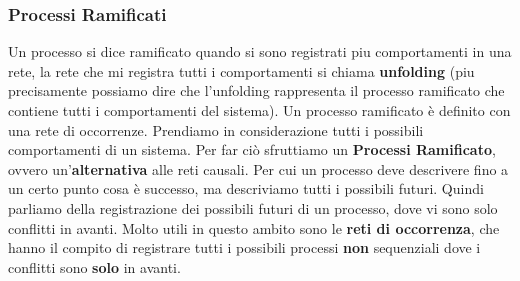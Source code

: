 \subsubsection{Processi Ramificati}
Un processo si dice ramificato quando si sono registrati piu comportamenti in una rete, la rete che
mi registra tutti i comportamenti si chiama \textbf{unfolding} (piu precisamente possiamo dire che l’unfolding
rappresenta il processo ramificato che contiene tutti i comportamenti del sistema). Un processo
ramificato è definito con una rete di occorrenze.
Prendiamo in considerazione tutti i possibili comportamenti di un sistema. Per far ciò sfruttiamo un \textbf{Processi Ramificato}, ovvero un'\textbf{alternativa} alle reti causali. Per cui un processo deve descrivere fino a un certo punto cosa è successo, ma descriviamo tutti i possibili futuri. Quindi parliamo della registrazione dei possibili futuri di un processo, dove vi sono solo conflitti in avanti. Molto utili in questo ambito sono le \textbf{reti di occorrenza}, che hanno il compito di registrare tutti i possibili processi \textbf{non} sequenziali dove i conflitti sono \textbf{solo} in avanti.
